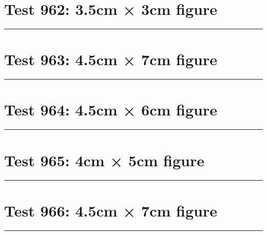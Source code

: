 \documentclass[a4paper,11pt]{article}
\begin{document}
\section*{Test 962: 3.5cm × 3cm figure}
\begin{swarmwrap}%
  \begin{minipage}[t]{3cm}
    \centering
    \rule{\linewidth}{3cm}
  \end{minipage}%
\end{swarmwrap}%
\swarmwrapnext
\lipsum[72]
\lipsum[73]
\lipsum[74]
\lipsum[75]
\lipsum[76]
\section*{Test 963: 4.5cm × 7cm figure}
\begin{swarmwrap}%
  \begin{minipage}[t]{4cm}
    \centering
    \rule{\linewidth}{7cm}
  \end{minipage}%
\end{swarmwrap}%
\swarmwrapnext
\lipsum[68]
\lipsum[69]
\lipsum[70]
\lipsum[71]
\lipsum[72]
\section*{Test 964: 4.5cm × 6cm figure}
\begin{swarmwrap}%
  \begin{minipage}[t]{4cm}
    \centering
    \rule{\linewidth}{6cm}
  \end{minipage}%
\end{swarmwrap}%
\swarmwrapnext
\lipsum[40]
\lipsum[41]
\lipsum[42]
\lipsum[43]
\section*{Test 965: 4cm × 5cm figure}
\begin{swarmwrap}%
  \begin{minipage}[t]{4cm}
    \centering
    \rule{\linewidth}{5cm}
  \end{minipage}%
\end{swarmwrap}%
\swarmwrapnext
\lipsum[105]
\lipsum[106]
\lipsum[107]
\section*{Test 966: 4.5cm × 7cm figure}
\begin{swarmwrap}%
  \begin{minipage}[t]{4cm}
    \centering
    \rule{\linewidth}{7cm}
  \end{minipage}%
\end{swarmwrap}%
\swarmwrapnext
\lipsum[8]
\lipsum[9]
\lipsum[10]
\lipsum[11]
\end{document}
